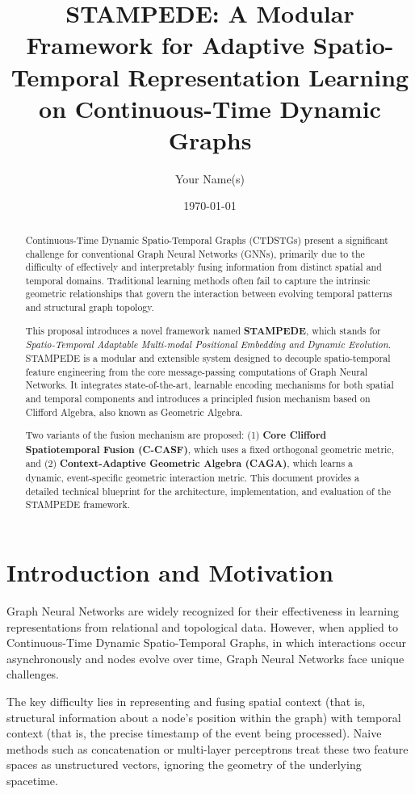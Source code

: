 \documentclass[11pt, a4paper]{article}
\title{\textbf{STAMPEDE: A Modular Framework for Adaptive Spatio-Temporal Representation Learning on Continuous-Time Dynamic Graphs}}
\author{Your Name(s)}
\date{\today}
\begin{document}
\maketitle

\begin{abstract}
Continuous-Time Dynamic Spatio-Temporal Graphs (CTDSTGs) present a significant challenge for conventional Graph Neural Networks (GNNs), primarily due to the difficulty of effectively and interpretably fusing information from distinct spatial and temporal domains. Traditional learning methods often fail to capture the intrinsic geometric relationships that govern the interaction between evolving temporal patterns and structural graph topology.

This proposal introduces a novel framework named \textbf{STAMPEDE}, which stands for \textit{Spatio-Temporal Adaptable Multi-modal Positional Embedding and Dynamic Evolution}. STAMPEDE is a modular and extensible system designed to decouple spatio-temporal feature engineering from the core message-passing computations of Graph Neural Networks. It integrates state-of-the-art, learnable encoding mechanisms for both spatial and temporal components and introduces a principled fusion mechanism based on Clifford Algebra, also known as Geometric Algebra.

Two variants of the fusion mechanism are proposed: (1) \textbf{Core Clifford Spatiotemporal Fusion (C-CASF)}, which uses a fixed orthogonal geometric metric, and (2) \textbf{Context-Adaptive Geometric Algebra (CAGA)}, which learns a dynamic, event-specific geometric interaction metric. This document provides a detailed technical blueprint for the architecture, implementation, and evaluation of the STAMPEDE framework.
\end{abstract}

\section{Introduction and Motivation}
Graph Neural Networks are widely recognized for their effectiveness in learning representations from relational and topological data. However, when applied to Continuous-Time Dynamic Spatio-Temporal Graphs, in which interactions occur asynchronously and nodes evolve over time, Graph Neural Networks face unique challenges.

The key difficulty lies in representing and fusing spatial context (that is, structural information about a node’s position within the graph) with temporal context (that is, the precise timestamp of the event being processed). Naive methods such as concatenation or multi-layer perceptrons treat these two feature spaces as unstructured vectors, ignoring the geometry of the underlying spacetime.
\end{document}

